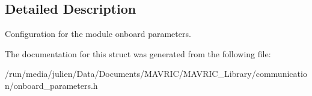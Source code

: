 \subsection{Detailed Description}
Configuration for the module onboard parameters. 

The documentation for this struct was generated from the following file\+:\begin{DoxyCompactItemize}
\item 
/run/media/julien/\+Data/\+Documents/\+M\+A\+V\+R\+I\+C/\+M\+A\+V\+R\+I\+C\+\_\+\+Library/communication/onboard\+\_\+parameters.\+h\end{DoxyCompactItemize}
